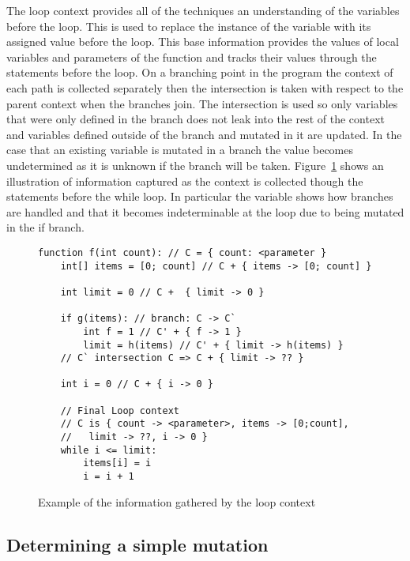 The loop context provides all of the techniques an understanding of the
variables before the loop.
This is used to replace the instance of the variable with its assigned value
before the loop.
This base information provides the values of local variables and parameters of
the function and tracks their values through the statements before the loop.
On a branching point in the program the context of each path is collected
separately then the intersection is taken with respect to the
parent context when the branches join.
The intersection is used so only variables that were only defined in the
branch does not leak into the rest of the context and variables defined outside
of the branch and mutated in it are updated.
In the case that an existing variable is mutated in a branch the value becomes
undetermined as it is unknown if the branch will be taken.
Figure~\ref{lst:loop-context} shows an illustration of information captured as
the context is collected though the statements before the while loop.
In particular the variable  shows how branches are handled
and that it becomes indeterminable at the loop due to being mutated in the if
branch.

\begin{figure}[ht]
\begin{lstlisting}
function f(int count): // C = { count: <parameter }
    int[] items = [0; count] // C + { items -> [0; count] }

    int limit = 0 // C +  { limit -> 0 } 

    if g(items): // branch: C -> C`
        int f = 1 // C' + { f -> 1 }
        limit = h(items) // C' + { limit -> h(items) }
    // C` intersection C => C + { limit -> ?? }

    int i = 0 // C + { i -> 0 }

    // Final Loop context
    // C is { count -> <parameter>, items -> [0;count],
    //   limit -> ??, i -> 0 }
    while i <= limit:
        items[i] = i
        i = i + 1
\end{lstlisting}
\caption{Example of the information gathered by the loop context}
\label{lst:loop-context}
\end{figure}

\subsection{Determining a simple mutation}\label{s:simple-mut}


